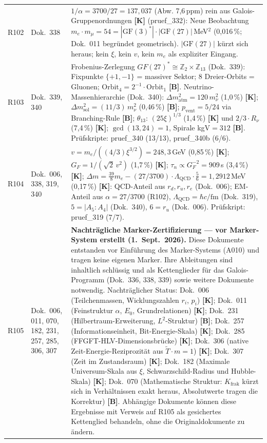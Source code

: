 \begin{longtable}{@{}p{0.9cm}p{3.1cm}p{10.2cm}@{}}
R102 & Dok.~338 & $1/\alpha = 3700/27 = 137{,}037$ (Abw. 7{,}6\,ppm) rein aus Galois-Gruppenordnungen \textbf{[K]} (pruef\_332): Neue Beobachtung $m_e\cdot m_\mu = 54 = |\text{GF}(3)^*|\cdot|\text{GF}(27)|$\,MeV$^2$ (0{,}016\,\%; Dok.~011 begründet geometrisch). $|\text{GF}(27)|$ kürzt sich heraus; kein $\xi$, kein $v$, kein $m_e$ als expliziter Eingang. \\
R103 & Dok.~339, 340 & Frobenius-Zerlegung $GF(27)^*\cong\mathbb{Z}_2\times\mathbb{Z}_{13}$ (Dok.~339): Fixpunkte $\{+1,-1\}$ = massiver Sektor; 8 Dreier-Orbits = Gluonen; $\text{Orbit}_4 = 2^{-1}\cdot\text{Orbit}_1$ \textbf{[B]}. Neutrino-Massenhierarchie (Dok.~340): $\Delta m^2_\text{atm}=120\,m_\nu^2$ (1{,}0\,\%) \textbf{[K]}; $\Delta m^2_\text{sol}=(11/3)\,m_\nu^2$ (0{,}46\,\%) \textbf{[B]}; $p_\text{vent}=5/24$ via Branching-Rule \textbf{[B]}; $\theta_{13}$: $(25\xi)^{1/3}$ (1{,}4\,\%) \textbf{[K]} und $2/3\cdot R_\nu$ (7{,}4\,\%) \textbf{[K]}; $\gcd(13,24)=1$, Spirale kgV$=312$ \textbf{[B]}. Prüfskripte: pruef\_340 (13/13), pruef\_340b (6/6). \\
R104 & Dok.~006, 338, 319, 340 & $v=m_e/((4/3)\xi^{3/2})=248{,}3$\,GeV (0{,}85\,\%) \textbf{[K]}; $G_F=1/(\sqrt{2}\,v^2)$ (1{,}7\,\%) \textbf{[K]}; $\tau_n\propto G_F^{-2}=909$\,s (3{,}4\,\%) \textbf{[K]}; $\Delta m=\frac{39}{8}m_e-(27/3700)\cdot\Lambda_\text{QCD}\cdot\frac{5}{6}=1{,}2912$\,MeV (0{,}17\,\%) \textbf{[K]}: QCD-Anteil aus $r_d,r_u,r_e$ (Dok.~006); EM-Anteil aus $\alpha=27/3700$ (R102), $\Lambda_\text{QCD}=\hbar c/\mathrm{fm}$ (Dok.~319), $5=|A_5:A_4|$ (Dok.~340), $6=r_u$ (Dok.~006). Prüfskript: pruef\_319 (7/7). \\
R105 & Dok.~006, 011, 070, 182, 231, 257, 285, 306, 307 & \textbf{Nachträgliche Marker-Zertifizierung — vor Marker-System erstellt (1.~Sept.~2026).} Diese Dokumente entstanden vor Einführung des Marker-Systems (A010) und tragen keine eigenen Marker. Ihre Ableitungen sind inhaltlich schlüssig und als Kettenglieder für das Galois-Programm (Dok.~336, 338, 339) sowie weitere Dokumente notwendig. Nachträglicher Status: Dok.~006 (Teilchenmassen, Wicklungszahlen $r_i$, $p_i$) \textbf{[K]}; Dok.~011 (Feinstruktur $\alpha$, $E_0$, Grundrelationen) \textbf{[K]}; Dok.~231 (Hilbertraum-Erweiterung, $L^2$-Struktur) \textbf{[B]}; Dok.~257 (Informationseinheit, Bit-Energie-Skala) \textbf{[K]}; Dok.~285 (FFGFT-HLV-Dimensionsbrücke) \textbf{[K]}; Dok.~306 (native Zeit-Energie-Reziprozität aus $\tilde{T}\cdot m=1$) \textbf{[K]}; Dok.~307 (Zeit im Zustandsraum) \textbf{[K]}; Dok.~182 (Maximale Universum-Skala aus $\xi$, Schwarzschild-Radius und Hubble-Skala) \textbf{[K]}; Dok.~070 (Mathematische Struktur: $K_\text{frak}$ kürzt sich in Verhältnissen exakt heraus, Absolutwerte tragen die Korrektur) \textbf{[B]}. Abhängige Dokumente können diese Ergebnisse mit Verweis auf R105 als gesichertes Kettenglied behandeln, ohne die Originaldokumente zu ändern. \\

\end{longtable}
